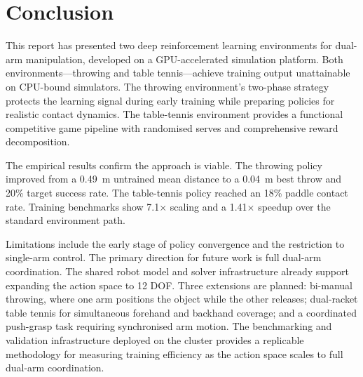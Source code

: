 \documentclass[11pt, a4paper]{article}
\begin{document}
\section{Conclusion}
\label{sec:conclusion}

This report has presented two deep reinforcement learning environments for dual-arm manipulation, developed on a GPU-accelerated simulation platform. Both environments---throwing and table tennis---achieve training output unattainable on CPU-bound simulators. The throwing environment's two-phase strategy protects the learning signal during early training while preparing policies for realistic contact dynamics. The table-tennis environment provides a functional competitive game pipeline with randomised serves and comprehensive reward decomposition.

The empirical results confirm the approach is viable. The throwing policy improved from a 0.49~m untrained mean distance to a 0.04~m best throw and 20\% target success rate. The table-tennis policy reached an 18\% paddle contact rate. Training benchmarks show 7.1$\times$ scaling and a 1.41$\times$ speedup over the standard environment path.

Limitations include the early stage of policy convergence and the restriction to single-arm control. The primary direction for future work is full dual-arm coordination. The shared robot model and solver infrastructure already support expanding the action space to 12 DOF. Three extensions are planned: bi-manual throwing, where one arm positions the object while the other releases; dual-racket table tennis for simultaneous forehand and backhand coverage; and a coordinated push-grasp task requiring synchronised arm motion. The benchmarking and validation infrastructure deployed on the cluster provides a replicable methodology for measuring training efficiency as the action space scales to full dual-arm coordination.
\end{document}
